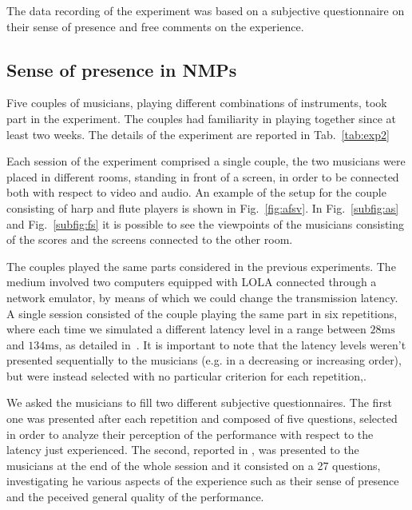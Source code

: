\documentclass[conference]{IEEEtran}
\begin{document}
The data recording of the experiment was based on a subjective questionnaire on their sense of presence and free comments on the experience. 





\subsection{Sense of presence in NMPs}
Five couples of musicians, playing different combinations of instruments, took part in the experiment. The couples had familiarity in playing together since at least two weeks. The details of the experiment are reported in Tab.~\ref{tab:exp2}

Each session of the experiment comprised a single couple, the two musicians were placed in different rooms, standing in front of a screen, in order to be connected both with respect to video and audio. An example of the setup for the couple consisting of harp and flute players is shown in Fig.~\ref{fig:afsv}. In Fig.~\ref{subfig:as} and Fig.~\ref{subfig:fs} it is possible to see the viewpoints of the musicians consisting of the scores and the screens connected to the other room. 

The couples played the same parts considered in the previous experiments. The medium involved two computers equipped with LOLA connected through a network emulator, by means of which we could change the transmission latency. A single session consisted of the couple playing the same part in six repetitions, where each time we simulated a different latency level in a range between $28\mathrm{ms}$ and $134\mathrm{ms}$, as detailed in~\cite{CIM2018}. It is important to note that the latency levels weren't presented sequentially to the musicians (e.g. in a decreasing or increasing order), but were instead selected with no particular criterion for each repetition,.

We asked the musicians to fill two different subjective questionnaires. The first one was presented after each repetition and composed of five questions, selected in order to analyze their perception of the performance with respect to the latency just experienced. The second, reported in \cite{CIM2018}, was presented to the musicians at the end of the whole session and it consisted on a 27 questions, investigating he various aspects of the experience such as their sense of presence and the peceived general quality of the performance.
\end{document}

